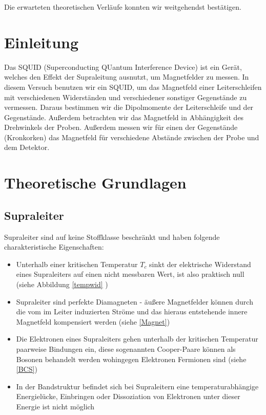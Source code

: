 \documentclass[12pt]{article}
\begin{document}
Die erwarteten theoretischen Verläufe konnten wir weitgehendst bestätigen.

\newpage

\thispagestyle{empty}
\tableofcontents
\newpage

\section{Einleitung}

Das SQUID (Superconducting QUantum Interference Device) ist ein Gerät, welches den Effekt der Supraleitung ausnutzt, um Magnetfelder zu messen. In diesem Versuch benutzen wir ein SQUID, um das Magnetfeld einer Leiterschleifen mit verschiedenen Widerständen und verschiedener sonstiger Gegenstände zu vermessen. Daraus bestimmen wir die Dipolmomente der Leiterschleife und der Gegenstände. Außerdem betrachten wir das Magnetfeld in Abhängigkeit des Drehwinkels der Proben. Außerdem messen wir für einen der Gegenstände (Kronkorken) das Magnetfeld für verschiedene Abstände zwischen der Probe und dem Detektor.


\newpage
\section{Theoretische Grundlagen}


\subsection{Supraleiter}\label{supraleiter}
Supraleiter sind auf keine Stoffklasse beschränkt und haben folgende charakteristische Eigenschaften:

\begin{itemize}
	\item Unterhalb einer kritischen Temperatur $T_c$ sinkt der elektrische Widerstand eines Supraleiters auf einen nicht messbaren Wert, ist also praktisch null (siehe Abbildung \ref{tempwid} )
	\item Supraleiter sind perfekte Diamagneten - äußere Magnetfelder können durch die vom im Leiter induzierten Ströme und das hieraus entstehende innere Magnetfeld kompensiert werden (siehe \ref{Magnet})
	\item Die Elektronen eines Supraleiters gehen unterhalb der kritischen Temperatur paarweise Bindungen ein, diese sogenannten Cooper-Paare können als Bosonen behandelt werden wohingegen Elektronen Fermionen sind (siehe \ref{BCS})
	\item In der Bandstruktur befindet sich bei Supraleitern eine temperaturabhängige Energielücke, Einbringen oder Dissoziation von Elektronen unter dieser Energie ist nicht möglich \label{bandluecke}
\end{itemize}
\end{document}
